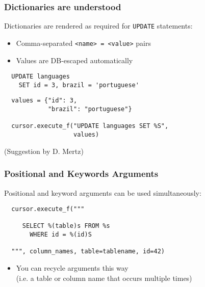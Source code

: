 \documentclass{beamer}
\begin{document}
\begin{frame}[fragile]
  \frametitle{Dictionaries are understood}

  Dictionaries are rendered as required for \texttt{UPDATE} statements:
  \begin{itemize}
  \item Comma-separated \texttt{<name> = <value>} pairs
  \item Values are DB-escaped automatically
  \end{itemize}

\begin{verbatim}
  UPDATE languages 
    SET id = 3, brazil = 'portuguese'
\end{verbatim}
\vfill

\begin{verbatim}
  values = {"id": 3, 
            "brazil": "portuguese"}

  cursor.execute_f("UPDATE languages SET %S", 
                   values)
\end{verbatim}
\vfill


(Suggestion by D. Mertz)

\end{frame}



\begin{frame}[fragile]
  \frametitle{Positional and Keywords Arguments}

  Positional and keyword arguments can be used simultaneously:

\begin{verbatim}
  cursor.execute_f("""

     SELECT %(table)s FROM %s 
       WHERE id = %(id)S

  """, column_names, table=tablename, id=42)
\end{verbatim}

\begin{itemize}
\item You can recycle arguments this way \\
(i.e. a table or column name that occurs multiple times)
\end{itemize}


\end{frame}
\end{document}
